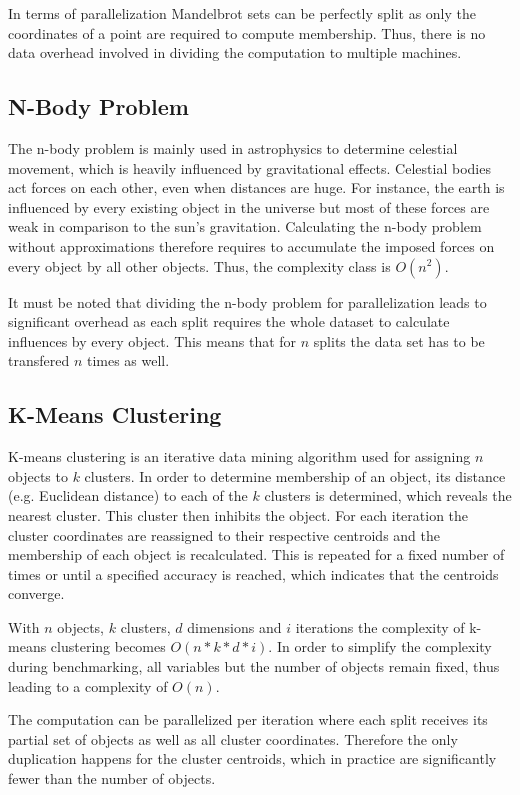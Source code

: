 In terms of parallelization Mandelbrot sets can be perfectly split as only the coordinates of a point are required to compute membership. Thus, there is no data overhead involved in dividing the computation to multiple machines.

\subsection*{N-Body Problem}

The n-body problem is mainly used in astrophysics to determine celestial movement, which is heavily influenced by gravitational effects. Celestial bodies act forces on each other, even when distances are huge. For instance, the earth is influenced by every existing object in the universe but most of these forces are weak in comparison to the sun's gravitation. Calculating the n-body problem without approximations therefore requires to accumulate the imposed forces on every object by all other objects. Thus, the complexity class is $O(n^2)$.

It must be noted that dividing the n-body problem for parallelization leads to significant overhead as each split requires the whole dataset to calculate influences by every object. This means that for $n$ splits the data set has to be transfered $n$ times as well.

\subsection*{K-Means Clustering}

K-means clustering is an iterative data mining algorithm used for assigning $n$ objects to $k$ clusters. In order to determine membership of an object, its distance (e.g. Euclidean distance) to each of the $k$ clusters is determined, which reveals the nearest cluster. This cluster then inhibits the object. For each iteration the cluster coordinates are reassigned to their respective centroids and the membership of each object is recalculated. This is repeated for a fixed number of times or until a specified accuracy is reached, which indicates that the centroids converge.

With $n$ objects, $k$ clusters, $d$ dimensions and $i$ iterations the complexity of k-means clustering becomes $O(n*k*d*i)$. In order to simplify the complexity during benchmarking, all variables but the number of objects remain fixed, thus leading to a complexity of $O(n)$.

The computation can be parallelized per iteration where each split receives its partial set of objects as well as all cluster coordinates. Therefore the only duplication happens for the cluster centroids, which in practice are significantly fewer than the number of objects.
